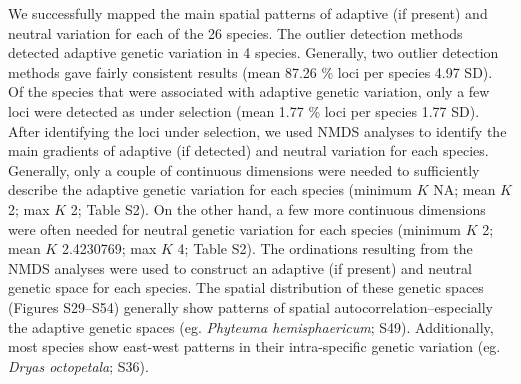 \documentclass[11pt,]{article}
\begin{document}
We successfully mapped the main spatial patterns of adaptive (if
present) and neutral variation for each of the 26 species. The outlier
detection methods detected adaptive genetic variation in 4 species.
Generally, two outlier detection methods gave fairly consistent results
(mean 87.26 \% loci per species 4.97 SD). Of the species that were
associated with adaptive genetic variation, only a few loci were
detected as under selection (mean 1.77 \% loci per species 1.77 SD).
After identifying the loci under selection, we used NMDS analyses to
identify the main gradients of adaptive (if detected) and neutral
variation for each species. Generally, only a couple of continuous
dimensions were needed to sufficiently describe the adaptive genetic
variation for each species (minimum \(K\) NA; mean \(K\) 2; max \(K\) 2;
Table S2). On the other hand, a few more continuous dimensions were
often needed for neutral genetic variation for each species (minimum
\(K\) 2; mean \(K\) 2.4230769; max \(K\) 4; Table S2). The ordinations
resulting from the NMDS analyses were used to construct an adaptive (if
present) and neutral genetic space for each species. The spatial
distribution of these genetic spaces (Figures S29--S54) generally show
patterns of spatial autocorrelation--especially the adaptive genetic
spaces (eg. \emph{Phyteuma hemisphaericum}; S49). Additionally, most
species show east-west patterns in their intra-specific genetic
variation (eg. \emph{Dryas octopetala}; S36).
\end{document}
